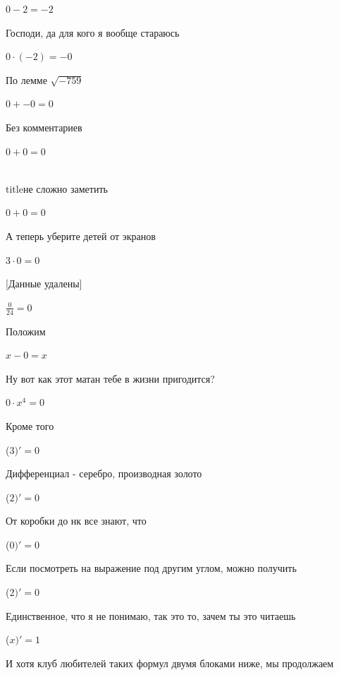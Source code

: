 \documentclass[12pt,a4paper,fleqn]{article}
\begin{document}
\begin{center}$0-2 = -2$\end{center}
Господи, да для кого я вообще стараюсь

\begin{center}$0 \cdot (-2) = -0$\end{center}
По лемме $\sqrt{-759}$
\begin{center}$0+-0 = 0$\end{center}
Без комментариев\cite{link4}

\begin{center}$0+0 = 0$\end{center}
\\ title{не сложно заметить} 

\begin{center}$0+0 = 0$\end{center}
А теперь уберите детей от экранов

\begin{center}$3 \cdot 0 = 0$\end{center}
[Данные удалены]

\begin{center}$\frac{0}{24} = 0$\end{center}
Положим

\begin{center}
$x-0 = x$\end{center}
Ну вот как этот матан тебе в жизни пригодится?

\begin{center}
$0 \cdot x^{4} = 0$\end{center}
Кроме того

\begin{center}
 ($3)'
  = 0$\end{center}
Дифференциал - серебро, производная золото\cite{link2}

\begin{center}
 ($2)'
  = 0$\end{center}
От коробки до нк все знают, что

\begin{center}
 ($0)'
  = 0$\end{center}
Если посмотреть на выражение под другим углом, можно получить

\begin{center}
 ($2)'
  = 0$\end{center}
Единственное, что я не понимаю, так это то, зачем ты это читаешь

\begin{center}
 ($x)'
  = 1$\end{center}
И хотя клуб любителей таких формул двумя блоками ниже, мы продолжаем
\end{document}
